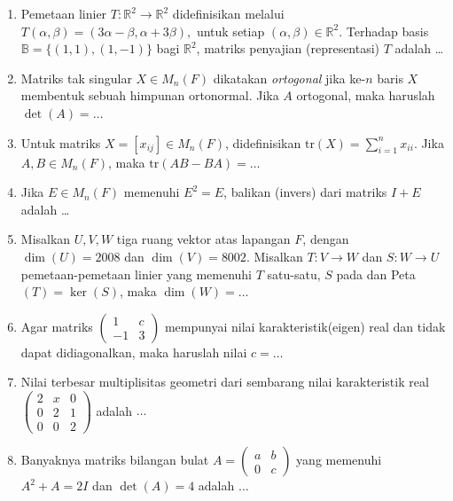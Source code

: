 \documentclass[12pt,twoside]{article}
\begin{document}
\begin{enumerate}
	\item Pemetaan linier $T:\mathbb{R}^2\to\mathbb{R}^2$ didefinisikan melalui $T(\alpha,\beta)=(3\alpha-\beta,\alpha+3\beta),$ untuk setiap $(\alpha,\beta)\in\mathbb{R}^2$. Terhadap basis $\mathbb{B}=\{(1,1),(1,-1)\}$ bagi $\mathbb{R}^2$, matriks penyajian (representasi) $T$ adalah \dots

	\item Matriks tak singular $X\in M_n(F)$ dikatakan \textit{ortogonal} jika ke-$n$ baris $X$ membentuk sebuah himpunan ortonormal. Jika $A$ ortogonal, maka haruslah $\det(A)=\dots$

	\item Untuk matriks $X=[x_{ij}]\in M_n(F)$, didefinisikan $\text{tr}(X)=\displaystyle\sum_{i=1}^{n}x_{ii}$. Jika $A,B\in M_n(F)$, maka $\text{tr}(AB-BA)=\dots$

	\item Jika $E\in M_n(F)$ memenuhi $E^2=E$, balikan (invers) dari matriks $I+E$ adalah \dots

	\item Misalkan $U,V,W$ tiga ruang vektor atas lapangan $F$, dengan $\dim(U)=2008$ dan $\dim(V)=8002$. Misalkan $T:V\to W$ dan $S:W\to U$ pemetaan-pemetaan linier yang memenuhi $T$ satu-satu, $S$ pada dan Peta$(T)=\ker(S)$, maka $\dim(W)=\dots$

	\item Agar matriks $\left(\begin{array}{cc}
			      1 & c \\-1&3
		      \end{array}\right)$ mempunyai nilai karakteristik(eigen) real dan tidak dapat didiagonalkan, maka haruslah nilai $c=\dots$

	\item Nilai terbesar multiplisitas geometri dari sembarang nilai karakteristik real $\left(\begin{array}{ccc}
			      2 & x & 0 \\0&2&1\\0&0&2
		      \end{array}\right)$ adalah $\dots
	      $ \\

	\item Banyaknya matriks bilangan bulat $A=\left(\begin{array}{ll}
			      a & b \\0&c
		      \end{array}\right)$ yang memenuhi $A^2+A=2I$ dan $\det(A)=4$ adalah $\dots
	      $
\end{enumerate}
\end{document}
